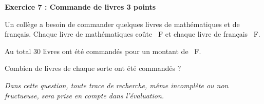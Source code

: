 \textbf{Exercice 7 : Commande de livres \hfill 3 points}

\medskip

Un collège a besoin de commander quelques livres de mathématiques et de français.
Chaque livre de mathématiques coûte ~F et chaque livre de français ~F.

Au total 30 livres ont été commandés pour un montant de ~F.

Combien de livres de chaque sorte ont été commandés ?

\emph{Dans cette question, toute trace de recherche, même incomplète ou non fructueuse, sera prise en compte dans l'évaluation.}

\vspace{0,5cm}

